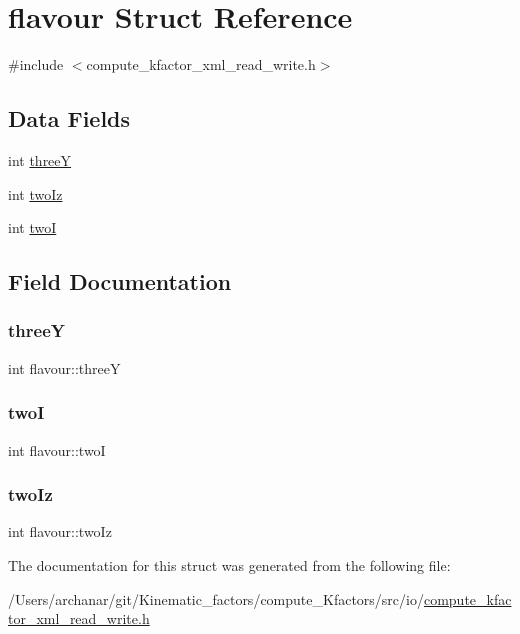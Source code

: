 \hypertarget{structflavour}{}\section{flavour Struct Reference}
\label{structflavour}


{\ttfamily \#include $<$compute\+\_\+kfactor\+\_\+xml\+\_\+read\+\_\+write.\+h$>$}

\subsection*{Data Fields}
\begin{DoxyCompactItemize}
\item 
int \mbox{\hyperlink{structflavour_a0ce917ad192c966c2fa061371f2cc1b6}{threeY}}
\item 
int \mbox{\hyperlink{structflavour_a4f1800c4988fe91de15939103bb508ee}{two\+Iz}}
\item 
int \mbox{\hyperlink{structflavour_ae5c0252558dcd34285db2bd0abd93998}{twoI}}
\end{DoxyCompactItemize}


\subsection{Field Documentation}
\mbox{\label{structflavour_a0ce917ad192c966c2fa061371f2cc1b6}} 
\subsubsection{\texorpdfstring{threeY}{threeY}}
{\footnotesize\ttfamily int flavour\+::threeY}

\mbox{\label{structflavour_ae5c0252558dcd34285db2bd0abd93998}} 
\subsubsection{\texorpdfstring{twoI}{twoI}}
{\footnotesize\ttfamily int flavour\+::twoI}

\mbox{\label{structflavour_a4f1800c4988fe91de15939103bb508ee}} 
\subsubsection{\texorpdfstring{twoIz}{twoIz}}
{\footnotesize\ttfamily int flavour\+::two\+Iz}



The documentation for this struct was generated from the following file\+:\begin{DoxyCompactItemize}
\item 
/\+Users/archanar/git/\+Kinematic\+\_\+factors/compute\+\_\+\+Kfactors/src/io/\mbox{\hyperlink{compute__kfactor__xml__read__write_8h}{compute\+\_\+kfactor\+\_\+xml\+\_\+read\+\_\+write.\+h}}\end{DoxyCompactItemize}
